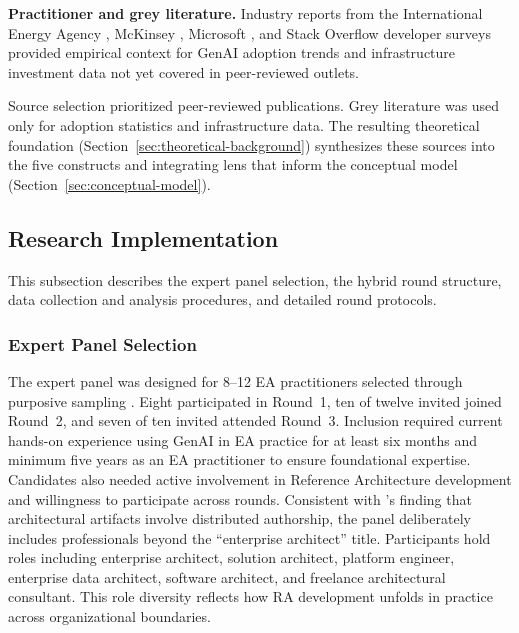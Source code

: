 \textbf{Practitioner and grey literature.} Industry reports from the
International Energy Agency \parencite{iea_energy_2025}, McKinsey
\parencite{mckinsey_cost_2025}, Microsoft \parencite{microsoft_wti_2025}, and
Stack Overflow developer surveys \parencite{stack_overflow_2024,
stack_overflow_2025} provided empirical context for GenAI adoption trends and
infrastructure investment data not yet covered in peer-reviewed outlets.

Source selection prioritized peer-reviewed publications. Grey literature was
used only for adoption statistics and infrastructure data. The resulting
theoretical foundation (Section~\ref{sec:theoretical-background}) synthesizes
these sources into the five constructs and integrating lens that inform the
conceptual model (Section~\ref{sec:conceptual-model}).

\subsection{Research Implementation}

This subsection describes the expert panel selection, the hybrid round
structure, data collection and analysis procedures, and detailed round
protocols.

\subsubsection{Expert Panel Selection}\label{subsec:expert-panel}

The expert panel was designed for 8--12 EA practitioners selected through
purposive sampling \parencite{patton_qualitative_2015}. Eight participated in
Round~1, ten of twelve invited joined Round~2, and seven of ten invited
attended Round~3. Inclusion required current
hands-on experience using GenAI in EA practice for at least six months and
minimum five years as an EA practitioner to ensure foundational expertise.
Candidates also needed active involvement in Reference Architecture
development and willingness to participate across rounds. Consistent with
\textcite{kotusev_enterprise_2018}'s finding that architectural artifacts involve
distributed authorship, the panel deliberately includes professionals beyond the
``enterprise architect'' title. Participants hold roles including enterprise
architect, solution architect, platform engineer, enterprise data architect,
software architect, and freelance architectural consultant. This role diversity
reflects how RA development unfolds in practice across organizational
boundaries.

